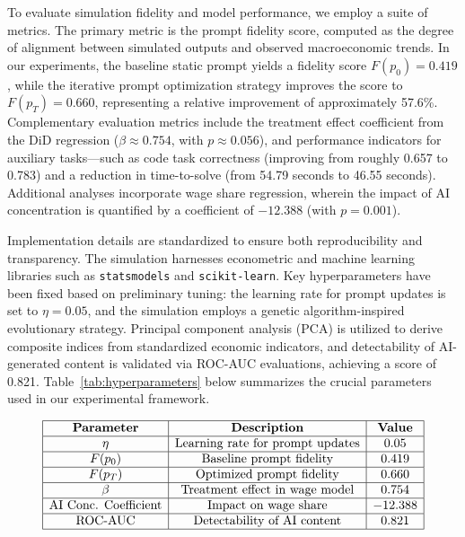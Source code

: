 \documentclass{article}
\begin{document}
To evaluate simulation fidelity and model performance, we employ a suite of metrics. The primary metric is the prompt fidelity score, computed as the degree of alignment between simulated outputs and observed macroeconomic trends. In our experiments, the baseline static prompt yields a fidelity score \(F(p_0) = 0.419\), while the iterative prompt optimization strategy improves the score to \(F(p_T) = 0.660\), representing a relative improvement of approximately 57.6\%. Complementary evaluation metrics include the treatment effect coefficient from the DiD regression (\(\beta \approx 0.754\), with \(p \approx 0.056\)), and performance indicators for auxiliary tasks—such as code task correctness (improving from roughly 0.657 to 0.783) and a reduction in time-to-solve (from 54.79 seconds to 46.55 seconds). Additional analyses incorporate wage share regression, wherein the impact of AI concentration is quantified by a coefficient of \(-12.388\) (with \(p = 0.001\)).

Implementation details are standardized to ensure both reproducibility and transparency. The simulation harnesses econometric and machine learning libraries such as \texttt{statsmodels} and \texttt{scikit-learn}. Key hyperparameters have been fixed based on preliminary tuning: the learning rate for prompt updates is set to \(\eta = 0.05\), and the simulation employs a genetic algorithm-inspired evolutionary strategy. Principal component analysis (PCA) is utilized to derive composite indices from standardized economic indicators, and detectability of AI-generated content is validated via ROC-AUC evaluations, achieving a score of 0.821. Table~\ref{tab:hyperparameters} below summarizes the crucial parameters used in our experimental framework.

\[
\begin{array}{|c|c|c|}
\hline
\textbf{Parameter} & \textbf{Description} & \textbf{Value} \\
\hline
\eta & \text{Learning rate for prompt updates} & 0.05 \\
\hline
F(p_0) & \text{Baseline prompt fidelity} & 0.419 \\
\hline
F(p_T) & \text{Optimized prompt fidelity} & 0.660 \\
\hline
\beta & \text{Treatment effect in wage model} & 0.754 \\
\hline
\text{AI Conc. Coefficient} & \text{Impact on wage share} & -12.388 \\
\hline
\text{ROC-AUC} & \text{Detectability of AI content} & 0.821 \\
\hline
\end{array}
\]
\end{document}
